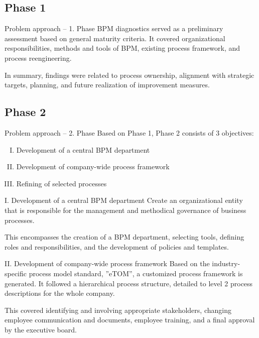 \documentclass{beamer}
\begin{document}
\subsection{Phase 1}
\begin{frame}{Problem approach -- 1. Phase}
    BPM diagnostics served as a preliminary assessment based on general maturity criteria.
    It covered organizational responsibilities, methods and tools of BPM, existing process framework, and process reengineering.

    \vspace{1em}

    In summary, findings were related to process ownership, alignment with strategic targets, planning, and future realization of improvement measures.
\end{frame}


\subsection{Phase 2}
\begin{frame}{Problem approach -- 2. Phase}
    Based on Phase 1, Phase 2 consists of 3 objectives:
    \begin{enumerate}[I.]
        \item Development of a central BPM department\\
        \item Development of company-wide process framework\\
        \item Refining of selected processes\\
    \end{enumerate}
\end{frame}

\begin{frame}{I. Development of a central BPM department}
    Create an organizational entity that is responsible for the management and methodical governance of business processes.

    \vspace{1em}

    This encompasses the creation of a BPM department, selecting tools, defining roles and responsibilities, and the development of policies and templates.
\end{frame}

\begin{frame}{II. Development of company-wide process framework}
    Based on the industry-specific process model standard, ''eTOM'', a customized process framework is generated.
    It followed a hierarchical process structure, detailed to level 2 process descriptions for the whole company.

    \vspace{1em}

    This covered identifying and involving appropriate stakeholders, changing employee communication and documents, employee training, and a final approval by the executive board.

\end{frame}
\end{document}

